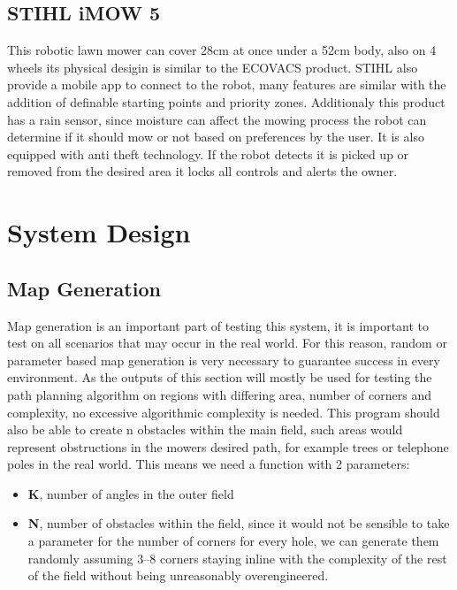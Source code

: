 \documentclass[final]{cmpreport_02}
\begin{document}
\subsection{STIHL iMOW 5}
This robotic lawn mower \citep{imow5} can cover 28cm at once under a 52cm body, also on 4 wheels its physical desigin is similar to the ECOVACS product.
STIHL also provide a mobile app to connect to the robot, many features are similar with the addition of definable starting points and priority zones.
Additionaly this product has a rain sensor, since moisture can affect the mowing process the robot can determine if it should mow or not based on preferences by the user.
It is also equipped with anti theft technology. If the robot detects it is picked up or removed from the desired area it locks all controls and alerts the owner.


\section{System Design}

\subsection{Map Generation}
Map generation is an important part of testing this system, it is important to test on all scenarios that may occur in the real world.
For this reason, random or parameter based map generation is very necessary to guarantee success in every environment.
As the outputs of this section will mostly be used for testing the path planning algorithm on regions with differing area, number of corners and complexity, no excessive algorithmic complexity is needed.
This program should also be able to create n obstacles within the main field, such areas would represent obstructions in the mowers desired path, for example trees or telephone poles in the real world.
This means we need a function with 2 parameters:

\begin{itemize}
	\item \textbf{K}, number of angles in the outer field
	\item \textbf{N}, number of obstacles within the field, since it would not be sensible to take a parameter for the number of corners for every hole, we can generate them randomly assuming 3–8 corners staying inline with the complexity of the rest of the field without being unreasonably overengineered.
\end{itemize}
\end{document}
